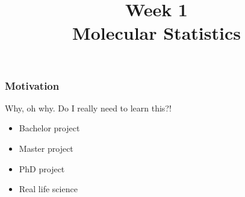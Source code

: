 

\usepackage{soul}

\title[]{Week 1\\Molecular Statistics}








{
\usebackgroundtemplate{}
\begin{frame}[plain]
    \titlepage
    \addtocounter{framenumber}{-1}
\end{frame}
}

{


\begin{frame}[fragile]

    \frametitle{Motivation}

     Why, oh why. Do I really need to learn this?!

     \bigskip
     \bigskip
     \bigskip
     \bigskip
     \bigskip

     \begin{itemize}
         \item Bachelor project
         \item Master project
         \item PhD project
         \item Real life science
     \end{itemize}

\end{frame}
}

